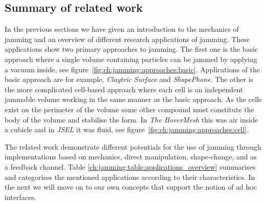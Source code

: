 \subsection{Summary of related work}

In the previous sections we have given an introduction to the mechanics of jamming and an overview of different research applications of jamming.
These applications show two primary approaches to jamming.
The first one is the basic approach where a single volume containing particles can be jammed by applying a vacuum inside, see figure~\ref{fig:ch:jamming:approaches:basic}.
Applications of the basic approach are for example, \emph{Claytric Surface} and \emph{ShapePhone}.
The other is the more complicated cell-based approach where each cell is an independent jammable volume working in the same manner as the basic approach.
As the cells exist on the perimeter of the volume some other compound must constitute the body of the volume and stabilise the form.
In \emph{The HoverMesh} this was air inside a cubicle and in \emph{JSEL} it was fluid, see figure~\ref{fig:ch:jamming:approaches:cell}.

The related work demonstrate different potentials for the use of jamming through implementations based on mechanics, direct manipulation, shape-change, and as a feedback channel.
Table \ref{ch:jamming:table:applications_overview} summarises and categorises the mentioned applications according to their characteristics.
In the next we will move on to our own concepts that support the notion of ad hoc interfaces.

